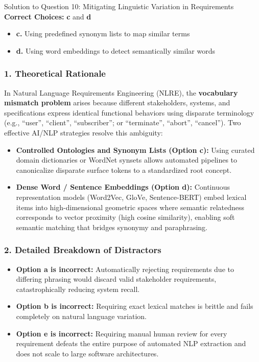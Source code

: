 \documentclass[11pt,a4paper]{article}
\begin{document}
\begin{solutionbox}{Solution to Question 10: Mitigating Linguistic Variation in Requirements}
\textbf{Correct Choices:} \textbf{c} and \textbf{d}
\begin{itemize}[leftmargin=1.5em]
    \item \textbf{c.} Using predefined synonym lists to map similar terms
    \item \textbf{d.} Using word embeddings to detect semantically similar words
\end{itemize}

\subsubsection*{1. Theoretical Rationale}
In Natural Language Requirements Engineering (NLRE), the \textbf{vocabulary mismatch problem} arises because different stakeholders, systems, and specifications express identical functional behaviors using disparate terminology (e.g., ``user'', ``client'', ``subscriber''; or ``terminate'', ``abort'', ``cancel''). Two effective AI/NLP strategies resolve this ambiguity:
\begin{itemize}[leftmargin=1.5em]
    \item \textbf{Controlled Ontologies and Synonym Lists (Option c):} Using curated domain dictionaries or WordNet synsets allows automated pipelines to canonicalize disparate surface tokens to a standardized root concept.
    \item \textbf{Dense Word / Sentence Embeddings (Option d):} Continuous representation models (Word2Vec, GloVe, Sentence-BERT) embed lexical items into high-dimensional geometric spaces where semantic relatedness corresponds to vector proximity (high cosine similarity), enabling soft semantic matching that bridges synonymy and paraphrasing.
\end{itemize}

\subsubsection*{2. Detailed Breakdown of Distractors}
\begin{itemize}[leftmargin=1.5em]
    \item \textbf{Option a is incorrect:} Automatically rejecting requirements due to differing phrasing would discard valid stakeholder requirements, catastrophically reducing system recall.
    \item \textbf{Option b is incorrect:} Requiring exact lexical matches is brittle and fails completely on natural language variation.
    \item \textbf{Option e is incorrect:} Requiring manual human review for every requirement defeats the entire purpose of automated NLP extraction and does not scale to large software architectures.
\end{itemize}
\end{solutionbox}
\end{document}
